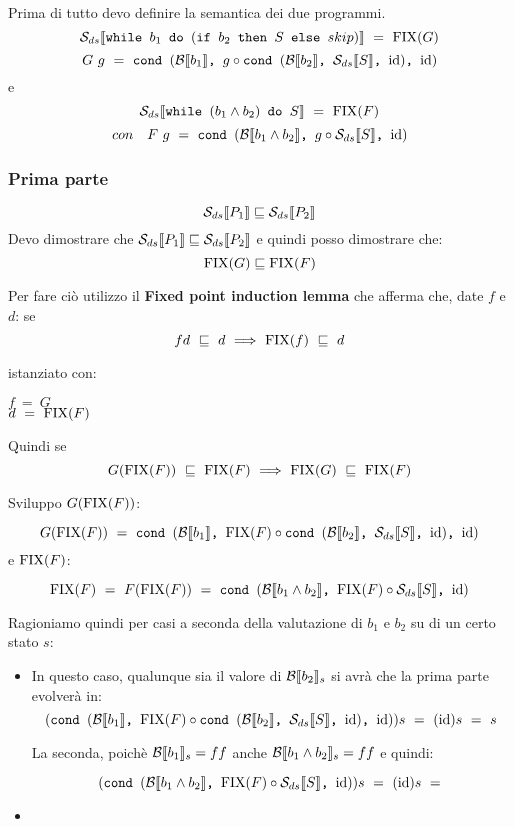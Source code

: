 {
    Prima di tutto devo definire la semantica dei due programmi.\\
    
  \[   \dsCtxt{$\exEightA{}$}~=~\fixp{G} \]
    \[ G~g~=~\cond{b_1}{g \circ \cond{b_2}{\Sds}{\idDS}}{\idDS} \]
    e
    \[ \dsCtxt{$\exEightB{}$}~=~\fixp{F} \]
     \[ con \quad    F~g~=~\cond{b_1\and{}b_2}{g \circ \Sds}{\idDS} \]
    
    \subsubsection{Prima parte} 
    \[ \dsCtxt{P_1} \mineq \dsCtxt{P_2}\]
    Devo dimostrare che $\dsCtxt{P_1} \mineq \dsCtxt{P_2}$ e quindi posso
    dimostrare che:
    \[ \fixp{G} \mineq \fixp{F} \]
    
    Per fare ciò utilizzo il \textbf{Fixed point induction lemma} che afferma
    che, date $f$ e $d$:
    se \[ fd~\mineq~d~\Longrightarrow~\fixp{f}~\mineq~d \]
 
    istanziato con:
    \begin{center}
    $f~=~G$ \\
    $d~=~\fixp{F}$
    \end{center}
    Quindi se \[ G(\fixp{F})~\mineq~\fixp{F}~\Longrightarrow~\fixp{G}~\mineq~\fixp{F} \]
   
    Sviluppo $G(\fixp{F})$:

    \[ G(\fixp{F})~=~\cond{b_1}{\fixp{F} \circ \cond{b_2}{\Sds}{\idDS}}{\idDS} \]
    e $\fixp{F}$:
    
    \[ \fixp{F}~=~F(\fixp{F})~=~\cond{b_1\and{}b_2}{\fixp{F} \circ \Sds}{\idDS} \]

    Ragioniamo quindi per casi a seconda della valutazione di $b_1$ e $b_2$ su
    di un certo stato $s$:
    \begin{itemize}
        \item {} In questo caso, qualunque sia il
        valore di $\evalBbs{b_2}{s}$ si avrà che la prima parte evolverà in:
        \[ (\cond{b_1}{\fixp{F} \circ \cond{b_2}{\Sds}{\idDS}}{\idDS})s~=~(\idDS)s
        ~=~s \]
       
        La seconda, poichè $\evalBbs{b_1}{s}=ff$ anche
        $\evalBbs{b_1\and{}b_2}{s}=ff$ e quindi:
       
       \[  (\cond{b_1\and{}b_2}{\fixp{F} \circ \Sds}{\idDS})s~=~(\idDS)s~=~ \]
        
        \item {} 
        

\end{itemize}}
